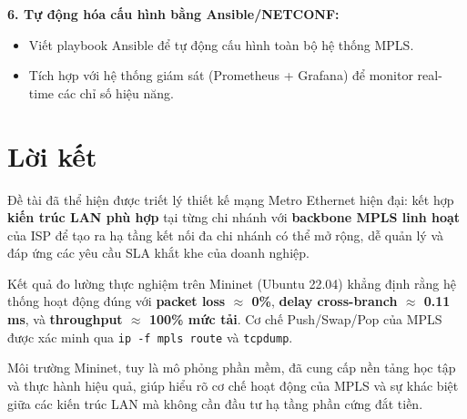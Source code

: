 \textbf{6. Tự động hóa cấu hình bằng Ansible/NETCONF:}
\begin{itemize}
    \item Viết playbook Ansible để tự động cấu hình toàn bộ hệ thống MPLS.
    \item Tích hợp với hệ thống giám sát (Prometheus + Grafana) để monitor real-time các chỉ số hiệu năng.
\end{itemize}

\section{Lời kết}

Đề tài đã thể hiện được triết lý thiết kế mạng Metro Ethernet hiện đại: kết hợp \textbf{kiến trúc LAN phù hợp} tại từng chi nhánh với \textbf{backbone MPLS linh hoạt} của ISP để tạo ra hạ tầng kết nối đa chi nhánh có thể mở rộng, dễ quản lý và đáp ứng các yêu cầu SLA khắt khe của doanh nghiệp.

Kết quả đo lường thực nghiệm trên Mininet (Ubuntu 22.04) khẳng định rằng hệ thống hoạt động đúng với \textbf{packet loss $\approx$ 0\%}, \textbf{delay cross-branch $\approx$ 0.11 ms}, và \textbf{throughput $\approx$ 100\% mức tải}. Cơ chế Push/Swap/Pop của MPLS được xác minh qua \texttt{ip -f mpls route} và \texttt{tcpdump}.

Môi trường Mininet, tuy là mô phỏng phần mềm, đã cung cấp nền tảng học tập và thực hành hiệu quả, giúp hiểu rõ cơ chế hoạt động của MPLS và sự khác biệt giữa các kiến trúc LAN mà không cần đầu tư hạ tầng phần cứng đắt tiền.
